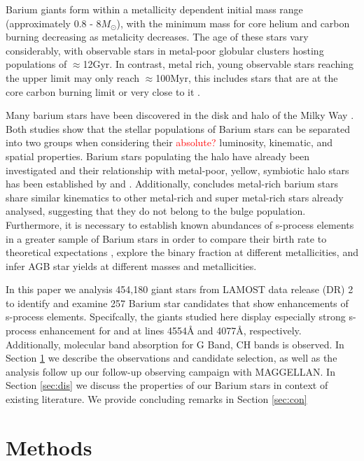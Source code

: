 \documentclass[a4paper,fleqn,usenatbib]{mnras}
\newcommand{\todo}[1]{\textcolor{red}{#1}}
\begin{document}
Barium giants form within a metallicity dependent initial mass range (approximately 0.8 - 8$M_{\odot}$), with the minimum mass for core helium and carbon burning decreasing as metalicity decreases. The age of these stars vary considerably, with observable stars in metal-poor globular clusters hosting populations of $\approx$12Gyr. In contrast, metal rich, young observable stars reaching the upper limit may only reach $\approx$100Myr, this includes stars that are at the core carbon burning limit or very close to it \citep[e.g.][]{whitelock2013}.

Many barium stars have been discovered in the disk and halo of the Milky Way \citep{gomez1997,mennessier1997}. Both studies show that the stellar populations of Barium stars can be separated into two groups when considering their \todo{absolute?} luminosity, kinematic, and spatial properties. Barium stars populating the halo have already been investigated \citep[e.g.][]{junqueira2001,drake2008,pereira2009,allen2006} and their relationship with metal-poor, yellow, symbiotic halo stars has been established by \citet{jorissen2005} and \citet{pereira2009}. Additionally, \citet{pereira2011} concludes metal-rich barium stars share similar kinematics to other metal-rich and super metal-rich stars already analysed, suggesting that they do not belong to the bulge population. Furthermore, it is necessary to establish known abundances of s-process elements in a greater sample of Barium stars in order to compare their birth rate to theoretical expectations \citep{han1995}, explore the binary fraction at different metallicities, and infer AGB star yields at different masses and metallicities.

In this paper we analysis 454,180 giant stars from LAMOST data release (DR) 2 to identify and examine 257 Barium star candidates that show enhancements of s-process elements. Specifcally, the giants studied here display especially strong s-process enhancement for  and  at lines 4554\AA \hspace{0.2mm} and 4077\AA, respectively. Additionally, molecular band absorption for G Band, CH bands is observed. In Section \ref{sec:methods} we describe the observations and candidate selection, as well as the analysis follow up our follow-up observing campaign with MAGGELLAN. In Section \ref{sec:dis} we discuss the properties of our Barium stars in context of existing literature. We provide concluding remarks in Section \ref{sec:con}

\section{Methods} \label{sec:methods}
\end{document}
